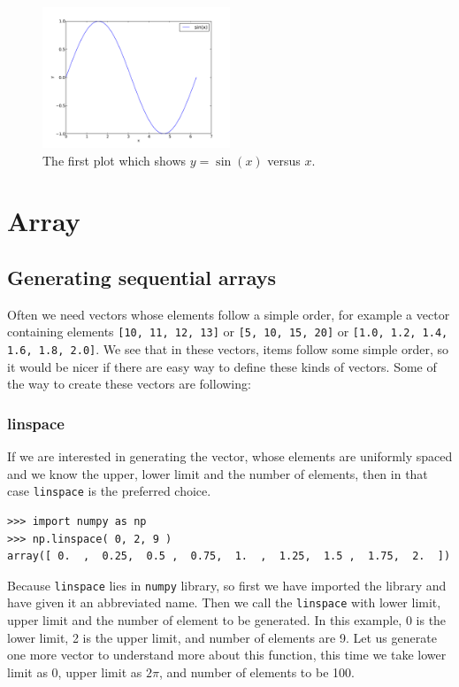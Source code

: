 \documentclass[10pt]{book}
\begin{document}
{\beforefig
\begin{figure}[h!]
  \centering
    \includegraphics[width=0.5\textwidth]{images/1.pdf}
  \caption{The first plot which shows $y = \sin(x)$ versus $x$. }
  \label{fig:1}
\end{figure}
\afterfig

\chapter{Array}
\section{Generating sequential arrays}
Often we need vectors whose elements follow a simple order, for example a vector containing elements \verb"[10, 11, 12, 13]" or \verb"[5, 10, 15, 20]" or \verb"[1.0, 1.2, 1.4, 1.6, 1.8, 2.0]". We see that in these vectors, items follow some simple order, so it would be nicer if there are easy way to define these kinds of vectors. Some of the way to create these vectors are following: 

\subsection{linspace}
If we are interested in generating the vector, whose elements are uniformly spaced and we know the upper, lower limit and the number of elements, then in that case \verb"linspace" is the preferred choice. 
\beforeverb
\begin{verbatim}
>>> import numpy as np
>>> np.linspace( 0, 2, 9 )       
array([ 0.  ,  0.25,  0.5 ,  0.75,  1.  ,  1.25,  1.5 ,  1.75,  2.  ])
\end{verbatim}
\afterverb
Because \verb"linspace" lies in \verb"numpy" library, so first we have imported the library and have given it an abbreviated name. Then we call the \verb"linspace" with lower limit, upper limit and the number of element to be generated. In this example, 0 is the lower limit, 2 is the upper limit, and number of elements are 9. Let us generate one more vector to understand more about this function, this time we take lower limit as 0, upper limit as $2\pi$, and number of elements to be 100.  

}
\end{document}
